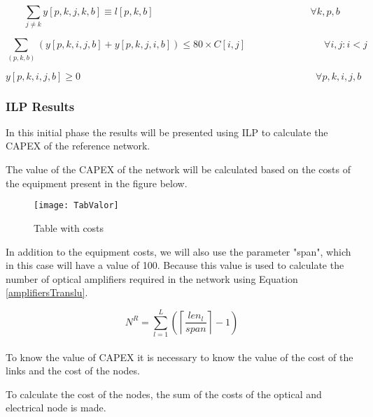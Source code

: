 \begin{equation}
\sum_{j \neq k} y[p,k,j,k,b] \equiv l[p,k,b]
\qquad \qquad \qquad \qquad \qquad \qquad \qquad \qquad
\forall k,p,b
\label{ILPTransluc8}
\end{equation}

\begin{equation}
\sum_{(p,k,b)} \left( y[p,k,i,j,b] + y[p,k,j,i,b]\right) \leq 80 \times C[i,j]
\qquad \qquad \qquad \qquad
\forall i,j : i < j
\label{ILPTransluc9}
\end{equation}

\begin{equation}
y[p,k,i,j,b] \geq 0
\qquad \qquad \qquad \qquad \qquad \qquad \qquad \qquad \qquad \qquad \qquad \qquad
\forall p,k,i,j,b
\label{ILPTransluc10}
\end{equation}	


\subsubsection{ILP Results}

In this initial phase the results will be presented using ILP to calculate the CAPEX of the reference network.

The value of the CAPEX of the network will be calculated based on the costs of the equipment present in the figure below.
\begin{figure}[h!]
  \centering
  \texttt{[image: TabValor]}
  \caption{Table with costs}
\end{figure}

In addition to the equipment costs, we will also use the parameter "span", which in this case will have a value of 100.
Because this value is used to calculate the number of optical amplifiers required in the network using Equation \ref{amplifiersTranslu}.

\begin{equation}
N^R = \sum\limits_{l=1}^L\left(\left\lceil\frac{len_l}{span}\right\rceil-1\right)
\label{amplifiersTranslu}
\end{equation} \\

To know the value of CAPEX it is necessary to know the value of the cost of the links and the cost of the nodes.

To calculate the cost of the nodes, the sum of the costs of the optical and electrical node is made. %

